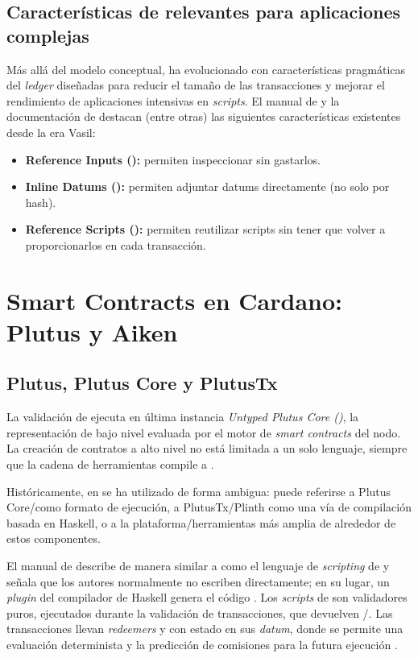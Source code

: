 \subsection{Características de \eUTxO relevantes para aplicaciones complejas}

Más allá del modelo conceptual, \Cardano ha evolucionado con características pragmáticas del \textit{ledger} diseñadas para reducir el tamaño de las transacciones y mejorar el rendimiento de aplicaciones intensivas en \textit{scripts}. El manual de \eUTxO \cite{eutxo_handbook_2022} y la documentación de \Cardano destacan (entre otras) las siguientes características existentes desde la era Vasil:

\begin{itemize}[noitemsep]
	\item \textbf{Reference Inputs ():} permiten inspeccionar \UTxOs sin gastarlos.
	\item \textbf{Inline Datums ():} permiten adjuntar datums directamente (no solo por hash).
	\item \textbf{Reference Scripts ():} permiten reutilizar scripts sin tener que volver a proporcionarlos en cada transacción.
\end{itemize}

\section{Smart Contracts en Cardano: Plutus y Aiken}
\subsection{Plutus, Plutus Core y PlutusTx}

La validación \Onchain de \Cardano ejecuta en última instancia \emph{Untyped Plutus Core (\UPLC)}, la representación de bajo nivel evaluada por el motor de \textit{smart contracts} del nodo. La creación de contratos a alto nivel no está limitada a un solo lenguaje, siempre que la cadena de herramientas compile a \UPLC.

Históricamente, \Plutus en \Cardano se ha utilizado de forma ambigua: puede referirse a Plutus Core/\UPLC como formato de ejecución, a PlutusTx/Plinth como una vía de compilación basada en Haskell, o a la plataforma/herramientas más amplia de \Plutus alrededor de estos componentes.

El manual de \eUTxO \cite{eutxo_handbook_2022} describe de manera similar a \Plutus como el lenguaje de \textit{scripting} de \Cardano y señala que los autores normalmente no escriben \Plutus directamente; en su lugar, un \textit{plugin} del compilador de Haskell genera el código \Onchain. Los \textit{scripts} de \Plutus son validadores puros, ejecutados durante la validación de transacciones, que devuelven \True/\False. Las transacciones llevan \textit{redeemers} y \UTxOs con estado en sus \textit{datum}, donde se permite una evaluación determinista y la predicción de comisiones para la futura ejecución \Onchain.

